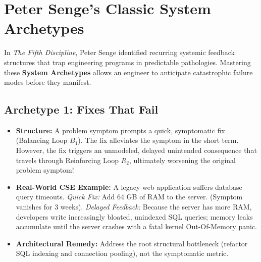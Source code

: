 \section{Peter Senge's Classic System Archetypes}
\label{sec:system_archetypes}

In \textit{The Fifth Discipline}, Peter Senge identified recurring systemic feedback structures that trap engineering programs in predictable pathologies. Mastering these \textbf{System Archetypes} allows an engineer to anticipate catastrophic failure modes before they manifest.

\subsection{Archetype 1: Fixes That Fail}
\begin{itemize}[leftmargin=1.5em]
    \item \textbf{Structure:} A problem symptom prompts a quick, symptomatic fix (Balancing Loop $B_1$). The fix alleviates the symptom in the short term. However, the fix triggers an unmodeled, delayed unintended consequence that travels through Reinforcing Loop $R_2$, ultimately worsening the original problem symptom!
    \item \textbf{Real-World CSE Example:} A legacy web application suffers database query timeouts. \textit{Quick Fix:} Add 64 GB of RAM to the server. (Symptom vanishes for 3 weeks). \textit{Delayed Feedback:} Because the server has more RAM, developers write increasingly bloated, unindexed SQL queries; memory leaks accumulate until the server crashes with a fatal kernel Out-Of-Memory panic.
    \item \textbf{Architectural Remedy:} Address the root structural bottleneck (refactor SQL indexing and connection pooling), not the symptomatic metric.
\end{itemize}

